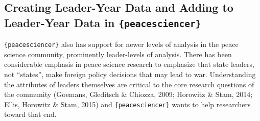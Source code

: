 \documentclass[
  11pt,
]{article}
\begin{document}
\hypertarget{creating-leader-year-data-and-adding-to-leader-year-data-in-peacesciencer}{%
\subsection{\texorpdfstring{Creating Leader-Year Data and Adding to Leader-Year Data in \texttt{\{peacesciencer\}}}{Creating Leader-Year Data and Adding to Leader-Year Data in \{peacesciencer\}}}\label{creating-leader-year-data-and-adding-to-leader-year-data-in-peacesciencer}}

\texttt{\{peacesciencer\}} also has support for newer levels of analysis in the peace science community, prominently leader-levels of analysis. There has been considerable emphasis in peace science research to emphasize that state leaders, not ``states'', make foreign policy decisions that may lead to war. Understanding the attributes of leaders themselves are critical to the core research questions of the community (Goemans, Gleditsch \& Chiozza, 2009; Horowitz \& Stam, 2014; Ellis, Horowitz \& Stam, 2015) and \texttt{\{peacesciencer\}} wants to help researchers toward that end.
\end{document}
